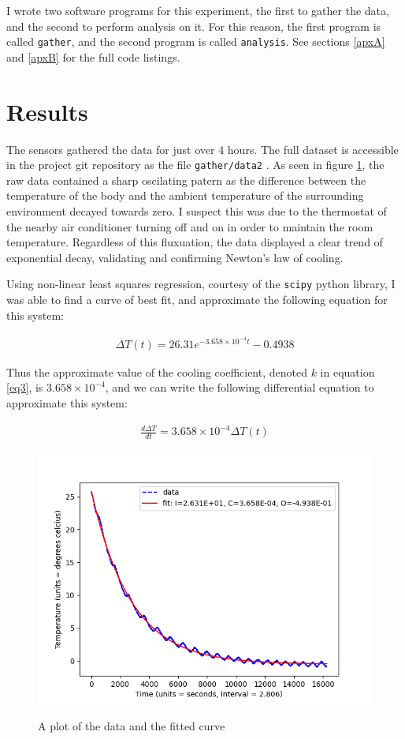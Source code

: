 \documentclass[12pt]{article}
\begin{document}
I wrote two software programs for this experiment,
the first to gather the data,
and the second to perform analysis on it.
For this reason, the first program
is called \texttt{gather},
and the second program is called \texttt{analysis}.
See sections \ref{apxA} and \ref{apxB} for the full code listings.


\section{Results}

The sensors gathered the data
for just over 4 hours.
The full dataset is accessible
in the project git repository
as the file \texttt{gather/data2} \cite{project_repo}.
As seen in figure \ref{fig1},
the raw data contained
a sharp oscilating patern
as the difference between
the temperature of the body
and the ambient temperature
of the surrounding environment
decayed towards zero.
I suspect this was due
to the thermostat of the nearby air conditioner
turning off and on in order to maintain the room temperature.
Regardless of this fluxuation,
the data displayed a clear trend
of exponential decay,
validating and confirming
Newton's law of cooling.

Using non-linear least squares regression,
courtesy of the \texttt{scipy} python library,
I was able to find a curve of best fit,
and approximate the following equation for this system:

\begin{align}
	\Delta T(t) = 26.31e^{-3.658 \times 10^{-4} t} - 0.4938
\end{align}

Thus the approximate value of the cooling coefficient,
denoted $k$ in equation \ref{eq3},
is $3.658 \times 10^{-4}$,
and we can write the following differential equation
to approximate this system:

\begin{align}
	\frac{d\Delta T}{dt} = 3.658 \times 10^{-4}\Delta T(t)
\end{align}

\begin{figure}
	\includegraphics[scale=0.8]{Figure_1.png}
	\centering
	\label{fig1}
	\caption{A plot of the data and the fitted curve}
\end{figure}
\end{document}
